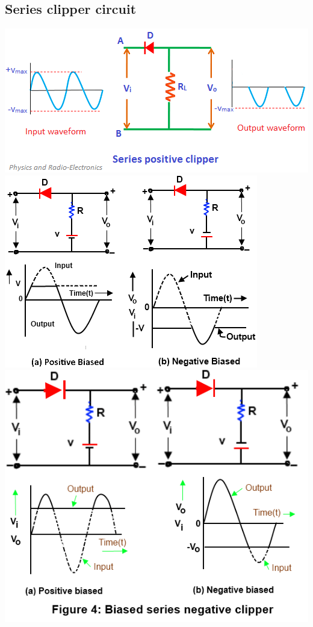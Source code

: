 \documentclass[10pt, a4paper]{report}
\begin{document}
	\subsection{Series clipper circuit}
	\includegraphics[width=\linewidth]{img/positiveseriesclipper}	\includegraphics[width=\linewidth]{img/series-positive-clipper-with-bias}
	\includegraphics[width=\linewidth]{img/series-negative-clipper-with-bias}
\end{document}
